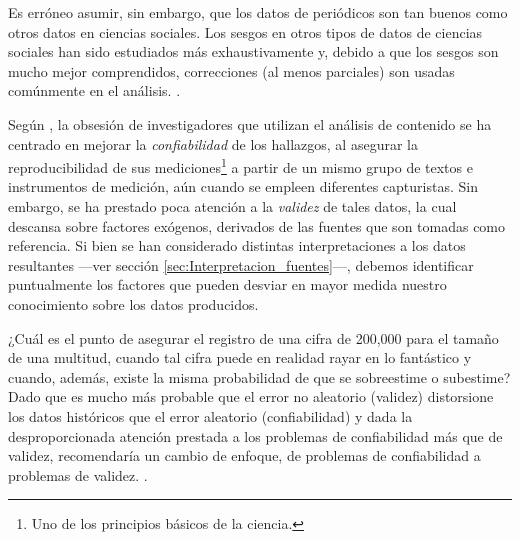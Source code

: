 \documentclass[letterpaper, 11pt]{book}
\theoremstyle{definition}
\theoremstyle{remark}
\begin{document}
\begin{center}
    \begin{minipage}{0.9\linewidth}
        {\setlength{\parindent}{12pt}\small
        Es erróneo asumir, sin embargo, que los datos de periódicos son tan buenos como otros datos en ciencias sociales. 
        Los sesgos en otros tipos de datos de ciencias sociales han sido estudiados más exhaustivamente y, debido a que los sesgos son mucho mejor comprendidos, correcciones (al menos parciales) son usadas comúnmente en el análisis. \normalsize \citep[411--412]{2005_Ortiz_NewspaperData}.
        }
    \end{minipage}
\end{center}


Según \citet{2010_Franzosi_QNA}, la obsesión de investigadores que utilizan el análisis de contenido se ha centrado en mejorar la \emph{confiabilidad} de los hallazgos, al asegurar la reproducibilidad de sus mediciones\footnote{
Uno de los principios básicos de la ciencia.} a partir de un mismo grupo de textos e instrumentos de medición, aún cuando se empleen diferentes capturistas. 
Sin embargo, se ha prestado poca atención a la \emph{validez} de tales datos, la cual descansa sobre factores exógenos, derivados de las fuentes que son tomadas como referencia. 
Si bien se han considerado distintas interpretaciones a los datos resultantes ---ver sección \ref{sec:Interpretacion_fuentes}---, debemos identificar puntualmente los factores que pueden desviar en mayor medida nuestro conocimiento sobre los datos producidos.

\begin{center}
    \begin{minipage}{0.9\linewidth}
        {\setlength{\parindent}{12pt}\small
        ¿Cuál es el punto de asegurar el registro de una cifra de 200,000 para el tamaño de una multitud, cuando tal cifra puede en realidad rayar en lo fantástico y cuando, además, existe la misma probabilidad de que se sobreestime o subestime? 
        Dado que es mucho más probable que el error no aleatorio (validez) distorsione los datos históricos que el error aleatorio (confiabilidad) y dada la desproporcionada atención prestada a los problemas de confiabilidad más que de validez, recomendaría un cambio de enfoque, de problemas de confiabilidad a problemas de validez. \citep[151]{2010_Franzosi_QNA}.
        }
    \end{minipage}
\end{center}
\end{document}
